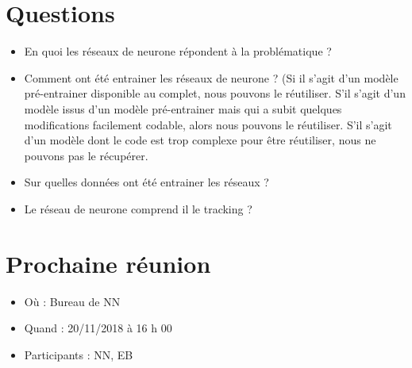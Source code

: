 \documentclass[11pt]{report}
\begin{document}
\section{Questions}
	\begin{itemize}
		\item En quoi les réseaux de neurone répondent à la problématique ?\\		
		\item Comment ont été entrainer les réseaux de neurone ? (Si il s'agit d'un modèle pré-entrainer disponible au complet, nous pouvons le réutiliser. S'il s'agit d'un modèle issus d'un modèle pré-entrainer mais qui a subit quelques modifications facilement  codable, alors nous pouvons le réutiliser. S'il s'agit d'un modèle dont le code est trop complexe pour être réutiliser, nous ne pouvons pas le récupérer.\\
		\item Sur quelles données ont été entrainer les réseaux ?\\
		\item Le réseau de neurone comprend il le tracking ?
	\end{itemize}
		
\section{Prochaine réunion}
	\begin{itemize}
		\item Où : Bureau de NN
		\item Quand : 20/11/2018 à 16 h 00
		\item Participants : NN, EB
	\end{itemize}
\end{document}
